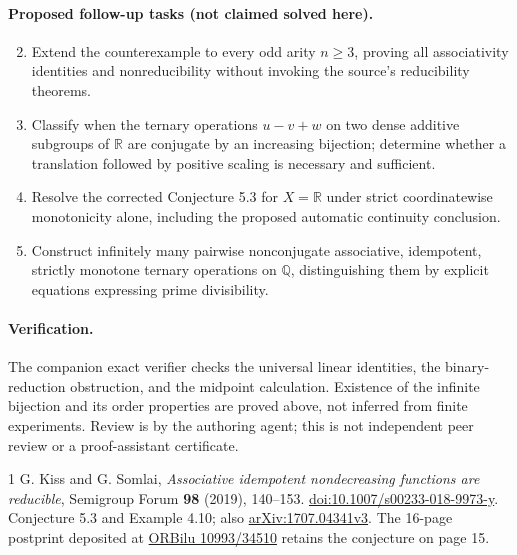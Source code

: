 \documentclass[11pt]{article}
\newcommand{\Q}{\mathbb Q}
\newcommand{\R}{\mathbb R}
\begin{document}
\paragraph{Proposed follow-up tasks (not claimed solved here).}
\begin{enumerate}
\setcounter{enumi}{1}
\item Extend the counterexample to every odd arity $n\ge3$, proving
all associativity identities and nonreducibility without invoking
the source's reducibility theorems.
\item Classify when the ternary operations $u-v+w$ on two dense
additive subgroups of $\R$ are conjugate by an increasing bijection;
determine whether a translation followed by positive scaling is
necessary and sufficient.
\item Resolve the corrected Conjecture 5.3 for $X=\R$ under strict
coordinatewise monotonicity alone, including the proposed automatic
continuity conclusion.
\item Construct infinitely many pairwise nonconjugate associative,
idempotent, strictly monotone ternary operations on $\Q$, distinguishing
them by explicit equations expressing prime divisibility.
\end{enumerate}

\paragraph{Verification.}
The companion exact verifier checks the universal linear identities,
the binary-reduction obstruction, and the midpoint calculation.
Existence of the infinite bijection and its order properties are proved
above, not inferred from finite experiments. Review is by the authoring
agent; this is not independent peer review or a proof-assistant certificate.

\begin{thebibliography}{1}
 G. Kiss and G. Somlai,
\emph{Associative idempotent nondecreasing functions are reducible},
Semigroup Forum \textbf{98} (2019), 140--153.
\href{https://doi.org/10.1007/s00233-018-9973-y}{doi:10.1007/s00233-018-9973-y}.
Conjecture 5.3 and Example 4.10; also
\href{https://arxiv.org/abs/1707.04341v3}{arXiv:1707.04341v3}.
The 16-page postprint deposited at
\href{https://orbilu.uni.lu/handle/10993/34510}{ORBilu 10993/34510}
retains the conjecture on page 15.
\end{thebibliography}
\end{document}
